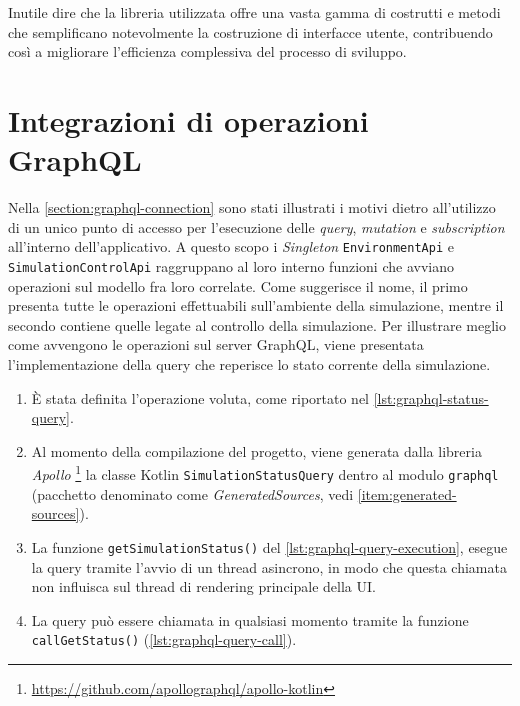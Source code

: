 Inutile dire che la libreria utilizzata offre una vasta gamma di costrutti e metodi che semplificano notevolmente la costruzione di interfacce utente, contribuendo così a migliorare l'efficienza complessiva del processo di sviluppo.

\section{Integrazioni di operazioni GraphQL}
Nella \cref{section:graphql-connection} sono stati illustrati i motivi dietro all'utilizzo di un unico punto di accesso per l'esecuzione delle \textit{query}, \textit{mutation} e \textit{subscription} all'interno dell'applicativo. A questo scopo i \textit{Singleton} \texttt{EnvironmentApi} e \texttt{SimulationControlApi} raggruppano al loro interno funzioni che avviano operazioni sul modello fra loro correlate.
Come suggerisce il nome, il primo presenta tutte le operazioni effettuabili sull'ambiente della simulazione, mentre il secondo contiene quelle legate al controllo della simulazione.
Per illustrare meglio come avvengono le operazioni sul server GraphQL, viene presentata l'implementazione della query che reperisce lo stato corrente della simulazione.
\begin{enumerate}
	\item È stata definita l'operazione voluta, come riportato nel \cref{lst:graphql-status-query}. 
	
	\item Al momento della compilazione del progetto, viene generata dalla libreria \textit{Apollo} \footnote{\url{https://github.com/apollographql/apollo-kotlin}} la classe Kotlin \texttt{SimulationStatusQuery} dentro al modulo \texttt{graphql} (pacchetto denominato come \textit{GeneratedSources}, vedi \cref{item:generated-sources}).
	\item La funzione \texttt{getSimulationStatus()} del \cref{lst:graphql-query-execution}, esegue la query tramite l'avvio di un thread asincrono, in modo che questa chiamata non influisca sul thread di rendering principale della \ac{UI}.
	
	\item La query può essere chiamata in qualsiasi momento tramite la funzione \newline \texttt{callGetStatus()} (\cref{lst:graphql-query-call}).
	
	
\end{enumerate}
